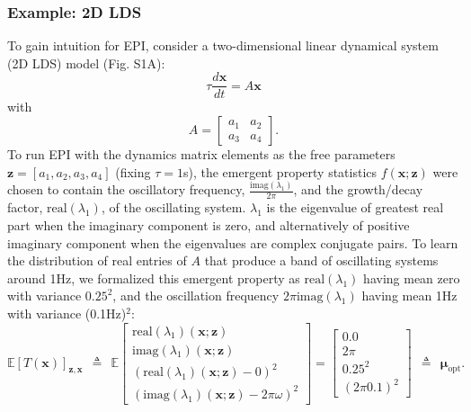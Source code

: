 \documentclass[11pt]{article}
\begin{document}
\subsubsection{Example: 2D LDS}\label{methods_2DLDS}
To gain intuition for EPI, consider a two-dimensional linear dynamical system (2D LDS) model (Fig. S1A):
\begin{equation} 
\tau \frac{d\mathbf{x}}{dt} = A\mathbf{x}
\end{equation}
with
\begin{equation}
A = \begin{bmatrix} a_1 & a_2 \\ a_3 & a_4 \end{bmatrix}.
\end{equation}
To run EPI with the dynamics matrix elements as the free parameters $\mathbf{z} = [ a_1, a_2, a_3, a_4]$ (fixing $\tau=1$s), the emergent property statistics $f(\mathbf{x}; \mathbf{z})$ were chosen to contain the oscillatory frequency, $\frac{\text{imag}(\lambda_1)}{2 \pi}$, and the growth/decay factor, $\text{real}(\lambda_1)$, of the oscillating system. 
 $\lambda_1$ is the eigenvalue of greatest real part when the imaginary component is zero, and alternatively of positive imaginary component when the eigenvalues are complex conjugate pairs.  
To learn the distribution of real entries of $A$ that produce a band of oscillating systems around 1Hz, we formalized this emergent property as $\text{real}(\lambda_1)$ having mean zero with variance $0.25^2$, and the oscillation frequency $2 \pi \text{imag}(\lambda_1)$ having mean 1Hz with variance (0.1Hz)$^2$:
\begin{equation}
 \mathbb{E}\left[T(\mathbf{x}) \right]_{\mathbf{z}, \mathbf{x}} ~~ \triangleq ~~ \mathbb{E} \begin{bmatrix} \text{real}(\lambda_1)(\mathbf{x}; \mathbf{z}) \\ \text{imag}(\lambda_1)(\mathbf{x}; \mathbf{z}) \\ (\text{real}(\lambda_1)(\mathbf{x}; \mathbf{z})-0)^2  \\ (\text{imag}(\lambda_1)(\mathbf{x}; \mathbf{z})-2 \pi \omega)^2 \end{bmatrix} = \begin{bmatrix} 0.0 \\ 2 \pi \\ 0.25^2 \\ (2 \pi 0.1)^2 \end{bmatrix} ~~ \triangleq ~~ \bm{\mu}_{\text{opt}}.
 \end{equation} 
\end{document}
